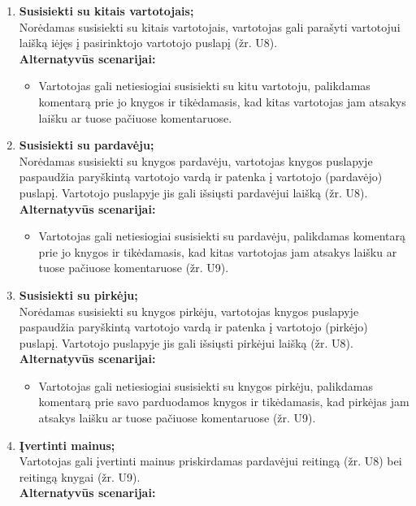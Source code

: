\documentclass{VUMIFPSkursinis}
\begin{document}
\begin{enumerate}[label=\textbf{U\arabic*.}]
			\item \textbf{Susisiekti su kitais vartotojais;}\\
				Norėdamas susisiekti su kitais vartotojais, vartotojas gali parašyti vartotojui laišką iėjęs į pasirinktojo vartotojo puslapį (žr. U8).\\
				\textbf{Alternatyvūs scenarijai:}
				\begin{itemize}
					\item Vartotojas gali netiesiogiai susisiekti su kitu vartotoju, palikdamas komentarą prie jo knygos ir tikėdamasis, kad kitas vartotojas jam atsakys laišku ar tuose pačiuose komentaruose.
				\end{itemize}
			\item \textbf{Susisiekti su pardavėju;}\\
				Norėdamas susisiekti su knygos pardavėju, vartotojas knygos puslapyje paspaudžia paryškintą vartotojo vardą ir patenka į vartotojo (pardavėjo) puslapį. Vartotojo puslapyje jis gali išsiųsti pardavėjui laišką (žr. U8).\\
				\textbf{Alternatyvūs scenarijai:}
				\begin{itemize}
					\item Vartotojas gali netiesiogiai susisiekti su pardavėju, palikdamas komentarą prie jo knygos ir tikėdamasis, kad kitas vartotojas jam atsakys laišku ar tuose pačiuose komentaruose (žr. U9).
				\end{itemize}
			\item \textbf{Susisiekti su pirkėju;}\\
				Norėdamas susisiekti su knygos pirkėju, vartotojas knygos puslapyje paspaudžia paryškintą vartotojo vardą ir patenka į vartotojo (pirkėjo) puslapį. Vartotojo puslapyje jis gali išsiųsti pirkėjui laišką (žr. U8).\\
				\textbf{Alternatyvūs scenarijai:}
				\begin{itemize}
					\item Vartotojas gali netiesiogiai susisiekti su knygos pirkėju, palikdamas komentarą prie savo parduodamos knygos ir tikėdamasis, kad pirkėjas jam atsakys laišku ar tuose pačiuose komentaruose (žr. U9).
				\end{itemize}
			\item \textbf{Įvertinti mainus;}\\ %
				Vartotojas gali įvertinti mainus priskirdamas pardavėjui reitingą (žr. U8) bei reitingą knygai (žr. U9).\\
				\textbf{Alternatyvūs scenarijai:}

\end{enumerate}
\end{document}
